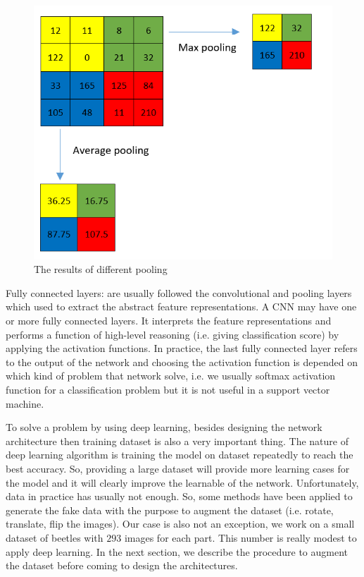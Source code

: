 \documentclass[review]{elsarticle}
\begin{document}
\begin{figure}[!h]
	\centering
	\includegraphics[scale=.5]{images/pooling}
	\caption{The results of different pooling}
	\label{imgcnn_pooling}
\end{figure}

Fully connected layers: are usually followed the convolutional and pooling layers which used to extract the abstract feature representations. A CNN may have one or more fully connected layers. It interprets the feature representations and performs a function of high-level reasoning (i.e. giving classification score) by applying the activation functions. In practice, the last fully connected layer refers to the output of the network and choosing the activation function is depended on which kind of problem that network solve, i.e. we usually softmax activation function for a classification problem but it is not useful in a support vector machine. 

To solve a problem by using deep learning, besides designing the network architecture then training dataset is also a very important thing. The nature of deep learning algorithm is training the model on dataset repeatedly to reach the best accuracy. So, providing a large dataset will provide more learning cases for the model and it will clearly improve the learnable of the network. Unfortunately, data in practice has usually not enough. So, some methods have been applied to generate the fake data with the purpose to augment the dataset (i.e. rotate, translate, flip the images). Our case is also not an exception, we work on a small dataset of beetles with $293$ images for each part. This number is really modest to apply deep learning. In the next section, we describe the procedure to augment the dataset before coming to design the architectures.
\end{document}
